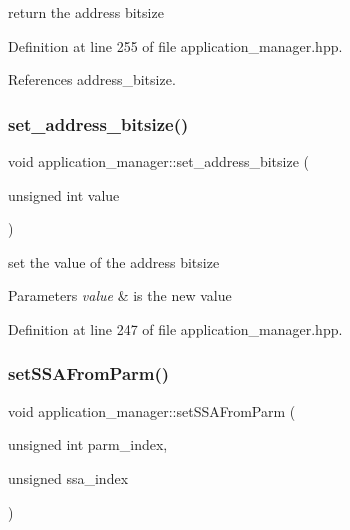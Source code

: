 return the address bitsize 



Definition at line 255 of file application\+\_\+manager.\+hpp.



References address\+\_\+bitsize.

\mbox{\label{classapplication__manager_a492bb69928f8fcc21ca0b4c3d19dd45c}} 
\subsubsection{\texorpdfstring{set\+\_\+address\+\_\+bitsize()}{set\_address\_bitsize()}}
{\footnotesize\ttfamily void application\+\_\+manager\+::set\+\_\+address\+\_\+bitsize (\begin{DoxyParamCaption}\item[{unsigned int}]{value }\end{DoxyParamCaption})\hspace{0.3cm}{\ttfamily [inline]}}



set the value of the address bitsize 


\begin{DoxyParams}{Parameters}
{\em value} & is the new value \\
\hline
\end{DoxyParams}


Definition at line 247 of file application\+\_\+manager.\+hpp.

\mbox{\label{classapplication__manager_a7b00a19f52bd23b5d4e35b93b46a3637}} 
\subsubsection{\texorpdfstring{set\+S\+S\+A\+From\+Parm()}{setSSAFromParm()}}
{\footnotesize\ttfamily void application\+\_\+manager\+::set\+S\+S\+A\+From\+Parm (\begin{DoxyParamCaption}\item[{unsigned int}]{parm\+\_\+index,  }\item[{unsigned}]{ssa\+\_\+index }\end{DoxyParamCaption})}



